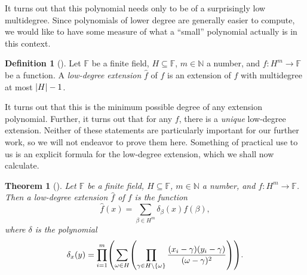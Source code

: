 \documentclass[english,12pt]{reedthesis}
\theoremstyle{plain}
\newtheorem{thm}{Theorem}[section]
\theoremstyle{definition}
\newtheorem{defn}[defn]{Definition}
\theoremstyle{remark}
\DeclarePairedDelimiter{\abs}{\lvert}{\rvert}
\begin{document}
It turns out that this polynomial needs only to be of a surprisingly low
multidegree. Since polynomials of lower degree are generally easier to compute,
we would like to have some measure of what a ``small'' polynomial actually is in
this context.

\begin{defn}[{\cite[]{CFGS22}}]\label{def:low-deg-ext}
  Let $\mathbb{F}$ be a finite field, $H \subseteq \mathbb{F}$, $m \in \mathbb{N}$ a number, and
  $f\colon H^{m} \rightarrow \mathbb{F}$ be a function. A \emph{low-degree extension}
  $\hat{f}$ of $f$ is an extension of $f$ with multidegree at most
  $\abs{H} - 1$.
\end{defn}

It turns out that this is the minimum possible degree of any extension
polynomial. Further, it turns out that for any $f$, there is a \emph{unique}
low-degree extension. Neither of these statements are particularly important for
our further work, so we will not endeavor to prove them here. Something of
practical use to us is an explicit formula for the low-degree extension, which
we shall now calculate.

\begin{thm}[{\cite[]{CFGS22}}]\label{thm:low-deg-ext-exists}
  Let $\mathbb{F}$ be a finite field, $H \subseteq \mathbb{F}$, $m \in \mathbb{N}$ a number, and
  $f\colon H^{m} \rightarrow \mathbb{F}$. Then a low-degree extension $\hat{f}$ of $f$ is
  the function
  \begin{equation}
    \hat{f}(x) = \sum_{\beta \in H^{m}}\delta_{\beta}(x)f(\beta),
  \end{equation}
  where $\delta$ is the polynomial
  \begin{equation}\label{eqn:delta-poly}
    \delta_{x}(y) = \prod_{i = 1}^{m}\mleft(\sum_{\omega \in H}\mleft(
        \prod_{\gamma \in H \setminus \{\omega\}}\frac{(x_{i} - \gamma)(y_{i} - \gamma)}{(\omega - \gamma)^{2}}
      \mright)\mright).
  \end{equation}
\end{thm}
\end{document}

